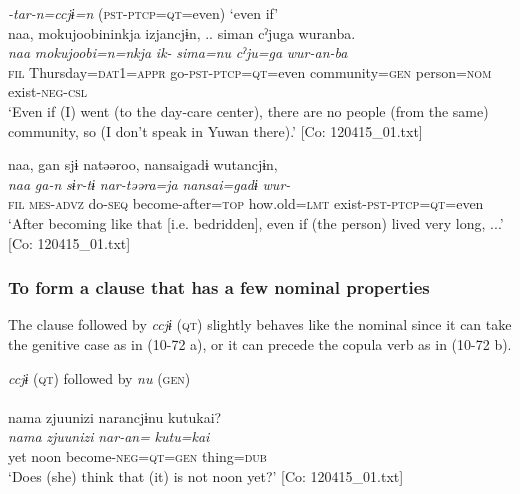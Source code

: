 \ea\label{ex:10.71}   \textit{{}-tar-n=ccjɨ=n} (\textsc{pst}-\textsc{ptcp}=\textsc{qt}=even) ‘even if’\\
  \ea  %
      \glll    naa,  {\textbar}mokujoobi{\textbar}ninkja  izjancjɨn, ..  siman  cˀjuga  wuranba.\\
      \textit{naa}  \textit{mokujoobi=n=nkja}  \textit{ik-} {} \textit{sima=nu}  \textit{cˀju=ga}  \textit{wur-an-ba}\\
      \textsc{fil}  Thursday=\textsc{dat}1=\textsc{appr}  go-\textsc{pst}-\textsc{ptcp}=\textsc{qt}=even {} community=\textsc{gen} person=\textsc{nom}  exist-\textsc{neg}-\textsc{csl}\\
      \glt       ‘Even if (I) went (to the day-care center), there are no people (from the same) community, so (I don’t speak in Yuwan there).’ [Co: 120415\_01.txt]

  \ex  %
      \glll    naa,  gan  sjɨ  natəəroo,  {\textbar}nansai{\textbar}gadɨ  wutancjɨn,\\
      \textit{naa}  \textit{ga-n}  \textit{sɨr-tɨ}  \textit{nar-təəra=ja}  \textit{nansai=gadɨ}  \textit{wur-}\\
      \textsc{fil}  \textsc{mes}-\textsc{advz}  do-\textsc{seq}  become-after=\textsc{top}  how.old=\textsc{lmt}   exist-\textsc{pst}-\textsc{ptcp}=\textsc{qt}=even\\
      \glt       ‘After becoming like that [i.e. bedridden], even if (the person) lived very long, ...’ [Co: 120415\_01.txt]
    \z
\z

\subsubsection{To form a clause that has a few nominal properties}\label{sec:10.4.1.5}

The clause followed by \textit{ccjɨ} (\textsc{qt}) slightly behaves like the nominal since it can take the genitive case as in (10-72 a), or it can precede the copula verb as in (10-72 b).

\ea\label{ex:10.72} 
\ea \textit{ccjɨ} (\textsc{qt}) followed by \textit{nu} (\textsc{gen})\\\\
      \glll    nama  {\textbar}zjuunizi{\textbar}  narancjɨnu  kutukai?\\
    \textit{nama}  \textit{zjuunizi}  \textit{nar-an=}  \textit{kutu=kai}\\
    yet  noon  become-\textsc{neg}=\textsc{qt}=\textsc{gen}  thing=\textsc{dub}\\
\glt     ‘Does (she) think that (it) is not noon yet?’  [Co: 120415\_01.txt]

